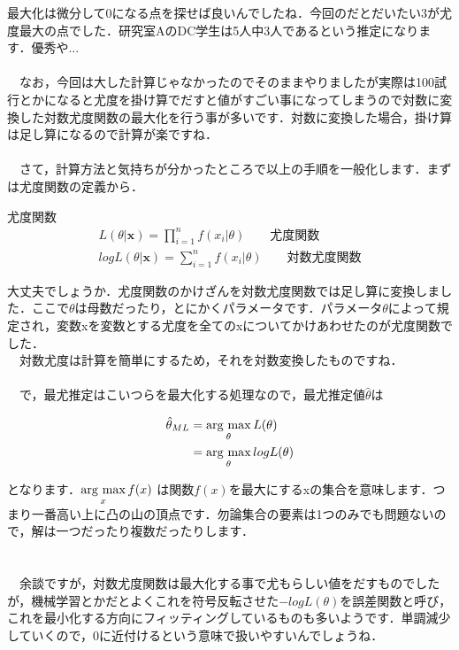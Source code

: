 \documentclass[11pt,a4paper]{jsarticle}                    %
\newcommand{\argmax}{\mathop{\rm arg~max}\limits}
\begin{document}
最大化は微分して0になる点を探せば良いんでしたね．今回のだとだいたい3が尤度最大の点でした．研究室AのDC学生は5人中3人であるという推定になります．優秀や...\\
\\
　なお，今回は大した計算じゃなかったのでそのままやりましたが実際は100試行とかになると尤度を掛け算でだすと値がすごい事になってしまうので対数に変換した対数尤度関数の最大化を行う事が多いです．対数に変換した場合，掛け算は足し算になるので計算が楽ですね．\\
\\
　さて，計算方法と気持ちが分かったところで以上の手順を一般化します．まずは尤度関数の定義から．

\begin{screen}
尤度関数
\begin{eqnarray}
L(\theta|\mathbf{x}) = \prod_{i=1} ^n f(x_i|\theta) \qquad \text{尤度関数}\\
logL(\theta|\mathbf{x}) = \sum_{i=1}^n f(x_i|\theta) \qquad \text{対数尤度関数}
\end{eqnarray}
\end{screen}

大丈夫でしょうか．尤度関数のかけざんを対数尤度関数では足し算に変換しました．ここで$\theta$は母数だったり，とにかくパラメータです．パラメータ$\theta$によって規定され，変数xを変数とする尤度を全てのxについてかけあわせたのが尤度関数でした．\\
　対数尤度は計算を簡単にするため，それを対数変換したものですね．\\
\\
　で，最尤推定はこいつらを最大化する処理なので，最尤推定値$\hat\theta$は


\begin{eqnarray}
\label{eq:ML2}
\begin{split}
\hat\theta_{ML} &= \argmax_\theta L(\theta) \\
&= \argmax_\theta logL(\theta)
\end{split}
\end{eqnarray}

となります．$\argmax_x f(x)$ は関数$f(x)$を最大にするxの集合を意味します．つまり一番高い上に凸の山の頂点です．勿論集合の要素は1つのみでも問題ないので，解は一つだったり複数だったりします．\\
\\
\\
　余談ですが，対数尤度関数は最大化する事で尤もらしい値をだすものでしたが，機械学習とかだとよくこれを符号反転させた$-logL(\theta)$を誤差関数と呼び，これを最小化する方向にフィッティングしているものも多いようです．単調減少していくので，0に近付けるという意味で扱いやすいんでしょうね．
\end{document}
